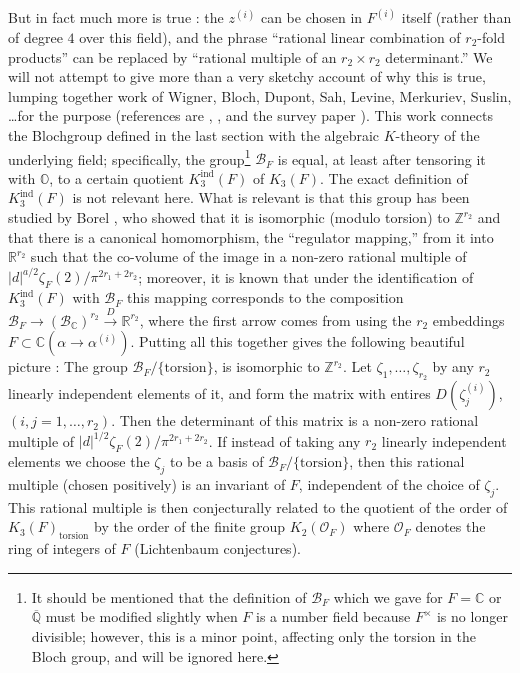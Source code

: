 But in fact much more is true : the $z^{(i)}$ can be chosen in $F^{(i)}$ itself (rather than of degree $4$ over this field), and the phrase ``rational linear combination of $r_{2}$-fold products'' can be replaced by ``rational multiple of an $r_{2}\times r_{2}$ determinant.'' We will not attempt to give more than a very sketchy account of why this is true, lumping together work of Wigner, Bloch, Dupont, Sah, Levine, Merkuriev, Suslin, \ldots for the purpose (references are \cite{art15-key1}, \cite{art15-key3}, and the survey paper \cite{art15-key7}). This work connects the Bloch\pageoriginale group defined in the last section with the algebraic $K$-theory of the underlying field; specifically, the group\footnote[1]{It should be mentioned that the definition of $\mathscr{B}_{F}$ which we gave for $F=\mathbb{C}$ or $\overline{\mathbb{Q}}$ must be modified slightly when $F$ is a number field because $F^{\times}$ is no longer divisible; however, this is a minor point, affecting only the torsion in the Bloch group, and will be ignored here.} $\mathscr{B}_{F}$ is equal, at least after tensoring it with $\mathbb{O}$, to a certain quotient $K^{\text{ind}}_{3}(F)$ of $K_{3}(F)$. The exact definition of $K^{\text{ind}}_{3}(F)$ is not relevant here. What is relevant is that this group has been studied by Borel \cite{art15-key2}, who showed that it is isomorphic (modulo torsion) to $\mathbb{Z}^{r_{2}}$ and that there is a canonical homomorphism, the ``regulator mapping,'' from it into $\mathbb{R}^{r_{2}}$ such that the co-volume of the image in a non-zero rational multiple of $|d|^{a/2}\zeta_{F}(2)/\pi^{2r_{1}+2r_{2}}$; moreover, it is known that under the identification of $K^{\text{ind}}_{3}(F)$ with $\mathscr{B}_{F}$ this mapping corresponds to the composition $\mathscr{B}_{F}\to (\mathscr{B}_{\mathbb{C}})^{r_{2}}\xrightarrow{D}\mathbb{R}^{r_{2}}$, where the first arrow comes from using the $r_{2}$ embeddings $F\subset \mathbb{C}(\alpha\to \alpha^{(i)})$. Putting all this together gives the following beautiful picture : The group $\mathscr{B}_{F}/\{\text{torsion}\}$, is isomorphic to $\mathbb{Z}^{r_{2}}$. Let $\zeta_{1},\ldots,\zeta_{r_{2}}$ by any $r_{2}$ linearly independent elements of it, and form the matrix with entires $D(\zeta^{(i)}_{j})$, $(i,j=1,\ldots,r_{2})$. Then the determinant of this matrix is a non-zero rational multiple of $|d|^{1/2}\zeta_{F}(2)/\pi^{2r_{1}+2r_{2}}$. If instead of taking any $r_{2}$ linearly independent elements we choose the $\zeta_{j}$ to be a basis of $\mathscr{B}_{F}/\{\text{torsion}\}$, then this rational multiple (chosen positively) is an invariant of $F$, independent of the choice of $\zeta_{j}$. This rational multiple is then conjecturally related to the quotient of the order of $K_{3}(F)_{\text{torsion}}$ by the order of the finite group $K_{2}(\mathscr{O}_{F})$ where $\mathscr{O}_{F}$ denotes the ring of integers of $F$ (Lichtenbaum conjectures).

